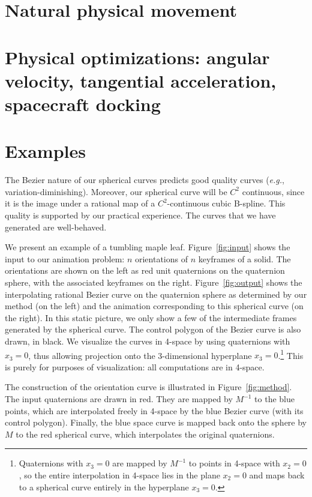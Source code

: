 \section{Natural physical movement}

\section{Physical optimizations: angular velocity, tangential acceleration,
	spacecraft docking}

\section{Examples}
\label{sec:eg}

The Bezier nature of our spherical curves predicts good quality curves
({\em e.g.}, variation-diminishing).
Moreover, our spherical curve will be $C^2$ continuous, since it is the image
under a rational map of a $C^2$-continuous cubic B-spline.
This quality is supported by our practical experience.
The curves that we have generated are well-behaved.

We present an example of a tumbling maple leaf.
Figure~\ref{fig:input} shows the input to our animation problem:
$n$ orientations of $n$ keyframes of a solid.
The orientations are shown on the left as red unit quaternions
on the quaternion sphere, with the associated keyframes on the right.
Figure~\ref{fig:output} shows the interpolating rational Bezier curve
on the quaternion sphere as determined by our method (on the left)
and the animation corresponding to this spherical curve (on the right).
In this static picture, we only show a few of the intermediate frames
generated by the spherical curve.
The control polygon of the Bezier curve is also drawn, in black.
We visualize the curves in 4-space by using quaternions with $x_3=0$,
thus allowing projection onto the 3-dimensional hyperplane 
$x_3=0$.\footnote{Quaternions with $x_3=0$ are mapped by $M^{-1}$ to points
	in 4-space with $x_2=0$, so the entire interpolation in 4-space
	lies in the plane $x_2=0$ and maps back to a spherical curve
	entirely in the hyperplane $x_3=0$.}
This is purely for purposes of visualization: all computations
are in 4-space.

The construction of the orientation curve is illustrated in
Figure~\ref{fig:method}.
The input quaternions are drawn in red.
They are mapped by $M^{-1}$ to the blue points, which are interpolated
freely in 4-space by the blue Bezier curve (with its control polygon).
Finally, the blue space curve is mapped back onto the sphere by $M$
to the red spherical curve, which interpolates the original quaternions.

